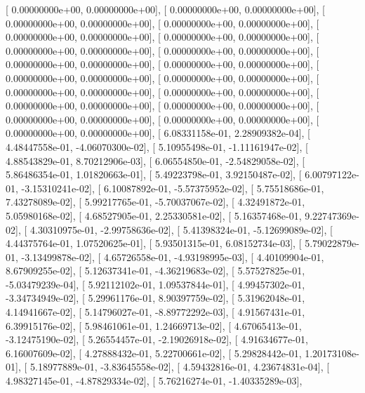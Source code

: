 \documentclass{article}
\begin{document}
       [  0.00000000e+00,   0.00000000e+00],
       [  0.00000000e+00,   0.00000000e+00],
       [  0.00000000e+00,   0.00000000e+00],
       [  0.00000000e+00,   0.00000000e+00],
       [  0.00000000e+00,   0.00000000e+00],
       [  0.00000000e+00,   0.00000000e+00],
       [  0.00000000e+00,   0.00000000e+00],
       [  0.00000000e+00,   0.00000000e+00],
       [  0.00000000e+00,   0.00000000e+00],
       [  0.00000000e+00,   0.00000000e+00],
       [  0.00000000e+00,   0.00000000e+00],
       [  0.00000000e+00,   0.00000000e+00],
       [  0.00000000e+00,   0.00000000e+00],
       [  0.00000000e+00,   0.00000000e+00],
       [  0.00000000e+00,   0.00000000e+00],
       [  0.00000000e+00,   0.00000000e+00],
       [  0.00000000e+00,   0.00000000e+00],
       [  0.00000000e+00,   0.00000000e+00],
       [  0.00000000e+00,   0.00000000e+00],
       [  6.08331158e-01,   2.28909382e-04],
       [  4.48447558e-01,  -4.06070300e-02],
       [  5.10955498e-01,  -1.11161947e-02],
       [  4.88543829e-01,   8.70212906e-03],
       [  6.06554850e-01,  -2.54829058e-02],
       [  5.86486354e-01,   1.01820663e-01],
       [  5.49223798e-01,   3.92150487e-02],
       [  6.00797122e-01,  -3.15310241e-02],
       [  6.10087892e-01,  -5.57375952e-02],
       [  5.75518686e-01,   7.43278089e-02],
       [  5.99217765e-01,  -5.70037067e-02],
       [  4.32491872e-01,   5.05980168e-02],
       [  4.68527905e-01,   2.25330581e-02],
       [  5.16357468e-01,   9.22747369e-02],
       [  4.30310975e-01,  -2.99758636e-02],
       [  5.41398324e-01,  -5.12699089e-02],
       [  4.44375764e-01,   1.07520625e-01],
       [  5.93501315e-01,   6.08152734e-03],
       [  5.79022879e-01,  -3.13499878e-02],
       [  4.65726558e-01,  -4.93198995e-03],
       [  4.40109904e-01,   8.67909255e-02],
       [  5.12637341e-01,  -4.36219683e-02],
       [  5.57527825e-01,  -5.03479239e-04],
       [  5.92112102e-01,   1.09537844e-01],
       [  4.99457302e-01,  -3.34734949e-02],
       [  5.29961176e-01,   8.90397759e-02],
       [  5.31962048e-01,   4.14941667e-02],
       [  5.14796027e-01,  -8.89772292e-03],
       [  4.91567431e-01,   6.39915176e-02],
       [  5.98461061e-01,   1.24669713e-02],
       [  4.67065413e-01,  -3.12475190e-02],
       [  5.26554457e-01,  -2.19026918e-02],
       [  4.91634677e-01,   6.16007609e-02],
       [  4.27888432e-01,   5.22700661e-02],
       [  5.29828442e-01,   1.20173108e-01],
       [  5.18977889e-01,  -3.83645558e-02],
       [  4.59432816e-01,   4.23674831e-04],
       [  4.98327145e-01,  -4.87829334e-02],
       [  5.76216274e-01,  -1.40335289e-03],
\end{document}
